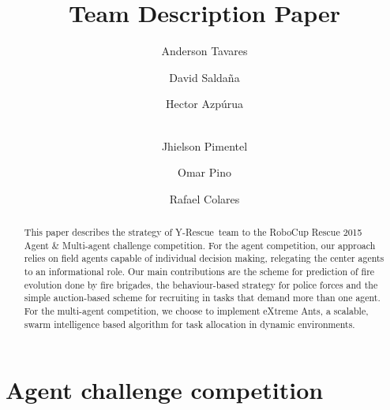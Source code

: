 \documentclass[runningheads,a4paper]{llncs}
\title{\teamname Team Description Paper}
\author{Anderson Tavares \and David Saldaña \and Hector Azpúrua \and\\ Jhielson Pimentel \and Omar Pino \and Rafael Colares}
\newcommand{\teamname}{Y-Rescue~}
\begin{document}
\titlerunning{\teamname TDP}



\maketitle

\begin{abstract}
This paper describes the strategy of \teamname team to the RoboCup Rescue 2015 Agent \& Multi-agent challenge competition. %
For the agent competition, our approach relies on field agents capable of individual decision making, relegating the center agents to an informational role. Our main contributions are the scheme for prediction of fire evolution done by fire brigades, the behaviour-based strategy for police forces and the simple auction-based scheme for recruiting in tasks that demand more than one agent. For the multi-agent competition, we choose to implement eXtreme Ants, a scalable, swarm intelligence based algorithm for task allocation in dynamic environments.
\end{abstract}




\section{Agent challenge competition}
\label{sec:agent}




















%
%

\end{document}
